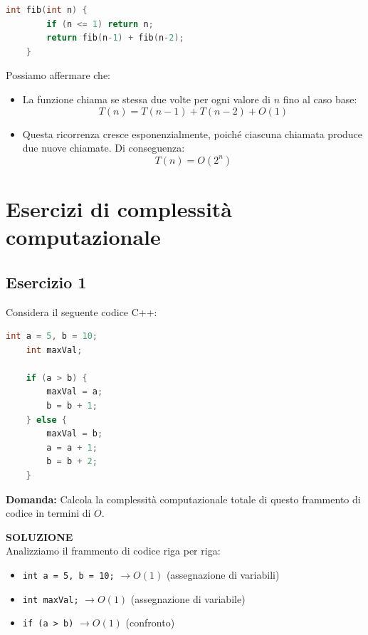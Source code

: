 \begin{lstlisting}[language=C++]
	int fib(int n) {
		if (n <= 1) return n;
		return fib(n-1) + fib(n-2);
	}
\end{lstlisting}

Possiamo affermare che: 

\begin{itemize}
	\item La funzione chiama se stessa due volte per ogni valore di $n$ fino al caso base:
	\[
	T(n) = T(n-1) + T(n-2) + O(1)
	\]
	
	\item Questa ricorrenza cresce esponenzialmente, poiché ciascuna chiamata produce due nuove chiamate. Di conseguenza:
	\[
	T(n) = O(2^n)
	\]
\end{itemize}

\section{Esercizi di complessità computazionale}

\subsection{Esercizio 1}

Considera il seguente codice C++:

\begin{lstlisting}[language=C++]
	int a = 5, b = 10;
	int maxVal;
	
	if (a > b) {
		maxVal = a;
		b = b + 1;
	} else {
		maxVal = b;
		a = a + 1;
		b = b + 2;
	}
\end{lstlisting}

\textbf{Domanda:} Calcola la complessità computazionale totale di questo frammento di codice in termini di $O$.

\vspace{1cm}

\textbf{SOLUZIONE} \\

Analizziamo il frammento di codice riga per riga:

\begin{itemize}
	\item \texttt{int a = 5, b = 10;} $\rightarrow O(1)$ (assegnazione di variabili)
	\item \texttt{int maxVal;} $\rightarrow O(1)$ (assegnazione di variabile)
	\item \texttt{if (a > b)} $\rightarrow O(1)$ (confronto)
\end{itemize}

